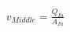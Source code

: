 \documentclass[preview]{standalone}
\begin{document}
\begin{align*}
v_{Middle} = \frac{\dot{Q}_{In}}{A_{In}}
\end{align*}
\end{document}
